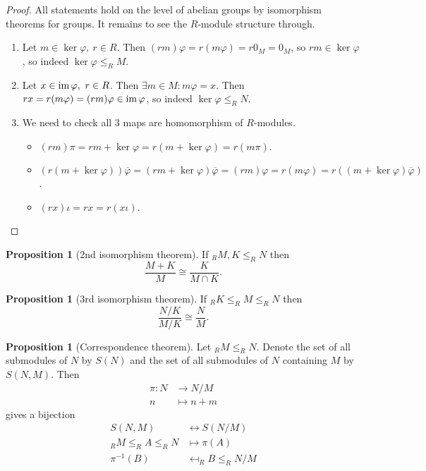\documentclass[a4paper]{article}
\newcommand{\im}{\text{im\,}}
\theoremstyle{definition}
\newtheorem{prop}[defn]{Proposition}
\begin{document}
\begin{proof}
All statements hold on the level of abelian groups by isomorphism theorems for groups. It remains to see the $R$-module structure through.
\begin{enumerate}
\item Let $m\in\ker\varphi,\ r\in R$. Then $(rm)\varphi=r(m\varphi)=r 0_M=0_M$, so $rm\in\ker\varphi$, so indeed $\ker\varphi\leq _RM$.
\item Let $x\in\im\varphi,\ r\in R$. Then $\exists m\in M:m\varphi=x$. Then $rx=r(m\varphi)=(rm)\varphi\in\im\varphi$, so indeed $\ker\varphi\leq _RN$.
\item We need to check all 3 maps are homomorphism of $R$-modules.
\begin{itemize}
\item $(rm)\pi=rm+\ker\varphi=r(m+\ker\varphi)=r(m\pi)$.
\item $(r(m+\ker\varphi))\overline\varphi=(rm+\ker\varphi)\overline\varphi=(rm)\varphi=r(m\varphi)=r((m+\ker\varphi)\overline\varphi)$.
\item $(rx)\iota=rx=r(x\iota)$.
\end{itemize}
\end{enumerate}
\end{proof}

\begin{prop}[2nd isomorphism theorem]
If $_RM,K\leq _RN$ then
\[
\frac{M+K}{M}\cong \frac{K}{M\cap K}.
\]
\end{prop}

\begin{prop}[3rd isomorphism theorem]
If $_RK\leq _RM\leq _RN$ then
\[
\frac{N/K}{M/K}\cong \frac{N}{M}.
\]
\end{prop}

\begin{prop}[Correspondence theorem]
Let $_RM\leq _RN$. Denote the set of all submodules of $N$ by $S(N)$ and the set of all submodules of $N$ containing $M$ by $S(N,M)$. Then
\[
\begin{aligned}
\pi:N&\rightarrow N/M\\
n&\mapsto n+m
\end{aligned}
\]
gives a bijection
\[
\begin{aligned}
S(N,M) &\leftrightarrow S(N/M)\\
_RM \leq _RA \leq _RN &\mapsto \pi(A)\\
\pi^{-1}(B) &\mapsfrom _RB\leq _R N/M
\end{aligned}
\]
\end{prop}
\end{document}
